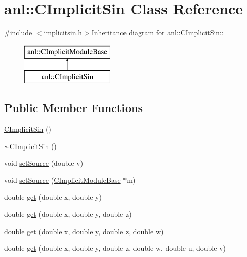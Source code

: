 \hypertarget{classanl_1_1CImplicitSin}{
\section{anl::CImplicitSin Class Reference}
\label{classanl_1_1CImplicitSin}
}


{\ttfamily \#include $<$implicitsin.h$>$}Inheritance diagram for anl::CImplicitSin::\begin{figure}[H]
\begin{center}
\leavevmode
\includegraphics[height=2cm]{classanl_1_1CImplicitSin}
\end{center}
\end{figure}
\subsection*{Public Member Functions}
\begin{DoxyCompactItemize}
\item 
\hyperlink{classanl_1_1CImplicitSin_a3ff5eeabfdaebf15ed25cd3903c6e093}{CImplicitSin} ()
\item 
\hyperlink{classanl_1_1CImplicitSin_a38a91b4da37aed48c9604d635e6cd94f}{$\sim$CImplicitSin} ()
\item 
void \hyperlink{classanl_1_1CImplicitSin_a42510c2ba672d40fc8e4988da6aca99c}{setSource} (double v)
\item 
void \hyperlink{classanl_1_1CImplicitSin_ad58f4c0bcfcc0ba251c659aa131ce119}{setSource} (\hyperlink{classanl_1_1CImplicitModuleBase}{CImplicitModuleBase} $\ast$m)
\item 
double \hyperlink{classanl_1_1CImplicitSin_a16e93edeebd6771c4a42c4c11939af19}{get} (double x, double y)
\item 
double \hyperlink{classanl_1_1CImplicitSin_a5b61d1f4f70eab619edf3b7085cc0759}{get} (double x, double y, double z)
\item 
double \hyperlink{classanl_1_1CImplicitSin_a5f666f8ad48fa7337524c304b63c8a1f}{get} (double x, double y, double z, double w)
\item 
double \hyperlink{classanl_1_1CImplicitSin_ace607a9e9526483fe588e3e7355e1b77}{get} (double x, double y, double z, double w, double u, double v)
\end{DoxyCompactItemize}
